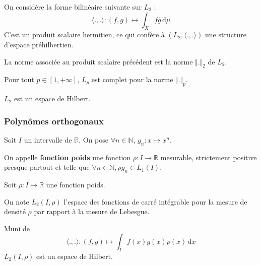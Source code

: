   \begin{definition}
    On considère la forme bilinéaire suivante sur $L_2$ :
    \[ \langle ., . \rangle : (f, g) \mapsto \int_X f \overline{g} \, \mathrm{d}\mu \]
    C'est un produit scalaire hermitien, ce qui confère à $(L_2, \langle ., . \rangle)$ une structure d'espace préhilbertien.
  \end{definition}

  \begin{remark}
    La norme associée au produit scalaire précédent est la norme $\Vert . \Vert_2$ de $L_2$.
  \end{remark}


  \begin{theorem}
    Pour tout $p \in [1, +\infty]$, $L_p$ est complet pour la norme $\Vert . \Vert_p$.
  \end{theorem}


  \begin{corollary}
    $L_2$ est un espace de Hilbert.
  \end{corollary}

  \subsubsection{Polynômes orthogonaux}


  Soit $I$ un intervalle de $\mathbb{R}$. On pose $\forall n \in \mathbb{N}$, $g_n : x \mapsto x^n$.

  \begin{definition}
    On appelle \textbf{fonction poids} une fonction $\rho : I \rightarrow \mathbb{R}$ mesurable, strictement positive presque partout et telle que $\forall n \in \mathbb{N}, \rho g_n \in L_1(I)$.
  \end{definition}

  Soit $\rho : I \rightarrow \mathbb{R}$ une fonction poids.

  \begin{notation}
    On note $L_2(I, \rho)$ l'espace des fonctions de carré intégrable pour la mesure de densité $\rho$ par rapport à la mesure de Lebesgue.
  \end{notation}

  \begin{proposition}
    Muni de
    \[ \langle ., . \rangle : (f,g) \mapsto \int_I f(x) \overline{g(x)} \rho(x) \, \mathrm{d}x \]
    $L_2(I, \rho)$ est un espace de Hilbert.
  \end{proposition}

